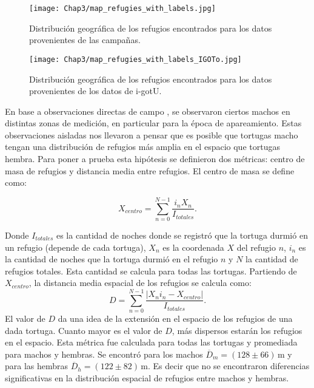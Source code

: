  
\begin{figure}[ht]
    \begin{center}
        \texttt{[image: Chap3/map\_refugies\_with\_labels.jpg]}
        \caption{Distribución geográfica de los refugios encontrados para los datos provenientes de las campañas.}
        \label{fig:refus_campanas_con_labels}
       
        \end{center}
\end{figure}
 
\begin{figure}[ht]
    \begin{center}
        \texttt{[image: Chap3/map\_refugies\_with\_labels\_IGOTo.jpg]}
        \caption{Distribución geográfica de los refugios encontrados para los datos provenientes de los datos de i-gotU.}
        \label{fig:refus_igotu_labels}
       
        \end{center}
\end{figure}
 
En base a observaciones directas de campo \cite{Erika}, se observaron ciertos machos en distintas zonas de medición, en particular para la época de apareamiento. Estas observaciones aisladas nos llevaron a pensar que es posible que  tortugas macho tengan una distribución de refugios más amplia en el espacio que tortugas hembra.  Para poner a prueba esta hipótesis se definieron dos métricas: centro de masa de refugios y distancia media entre refugios. El centro de masa se define como:
\begin{center}
   
 
$$X_{centro}= \sum^{N -1}_{n=0} \frac{i_{n} X_n}{I_{totales}}.$$
\end{center}
Donde $I_{totales}$ es la cantidad de noches donde se registró que la tortuga durmió en un refugio (depende de cada tortuga), $X_n$ es la coordenada $X$ del refugio $n$, $i_{n}$ es la cantidad de noches que la tortuga durmió en el refugio $n$ y $N$ la cantidad de refugios totales.  Esta cantidad se calcula para todas las tortugas.
Partiendo de $X_{centro}$, la distancia media  espacial de los refugios se calcula como:
$$D = \sum^{N -1}_{n=0} \frac{|X_n i_n - X_{centro}|}{I_{totales}}.$$
\label{eq:distancia_media_refugios}
El valor de $D$ da una idea de la extensión en el espacio de los refugios de una dada tortuga. Cuanto mayor es el valor de $D$, más dispersos estarán los refugios en el espacio. Esta métrica fue calculada para todas las tortugas y  promediada para  machos y hembras. Se encontró para los machos $\overline{D}_m =  (128\pm66)\,\text{m}$ y para las hembras     $\overline{D}_h = (122\pm82)\,\text{m}$. Es decir que no se encontraron diferencias significativas en la distribución espacial de refugios  entre machos y hembras.
